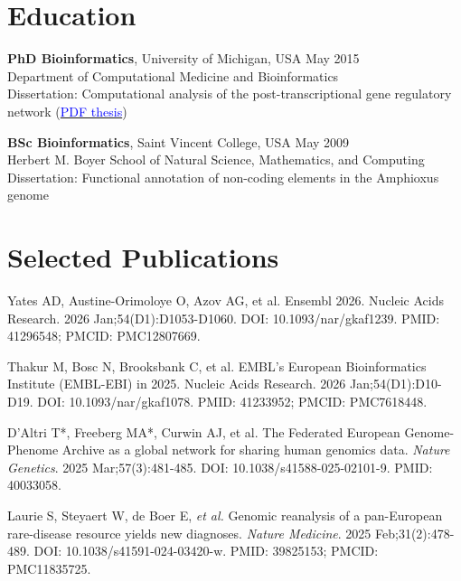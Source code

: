 \documentclass[margin,line]{res}
\begin{document}
\begin{resume}

\section{\sc Education}
{\bf PhD Bioinformatics}, University of Michigan, USA \hfill {May 2015}\\
Department of Computational Medicine and Bioinformatics\\ 
Dissertation: Computational analysis of the post-transcriptional gene regulatory network (\href{https://deepblue.lib.umich.edu/bitstream/handle/2027.42/111339/mafree_1.pdf?sequence=1&isAllowed=y}{\textcolor{blue}{PDF thesis}})

{\bf BSc Bioinformatics}, Saint Vincent College, USA \hfill {May 2009}\\
Herbert M. Boyer School of Natural Science, Mathematics, and Computing\\
Dissertation: Functional annotation of non-coding elements in the Amphioxus genome

\section{\sc Selected Publications}

Yates AD, Austine-Orimoloye O, Azov AG, et al. Ensembl 2026. Nucleic Acids Research. 2026 Jan;54(D1):D1053-D1060. DOI: 10.1093/nar/gkaf1239. PMID: 41296548; PMCID: PMC12807669.

Thakur M, Bosc N, Brooksbank C, et al. EMBL's European Bioinformatics Institute (EMBL-EBI) in 2025. Nucleic Acids Research. 2026 Jan;54(D1):D10-D19. DOI: 10.1093/nar/gkaf1078. PMID: 41233952; PMCID: PMC7618448.

D'Altri T*, Freeberg MA*, Curwin AJ, et al. The Federated European Genome-Phenome Archive as a global network for sharing human genomics data. {\em Nature Genetics}. 2025 Mar;57(3):481-485. DOI: 10.1038/s41588-025-02101-9. PMID: 40033058.

Laurie S, Steyaert W, de Boer E, {\em et al.} Genomic reanalysis of a pan-European rare-disease resource yields new diagnoses. {\em Nature Medicine}. 2025 Feb;31(2):478-489. DOI: 10.1038/s41591-024-03420-w. PMID: 39825153; PMCID: PMC11835725.


\end{resume}
\end{document}
